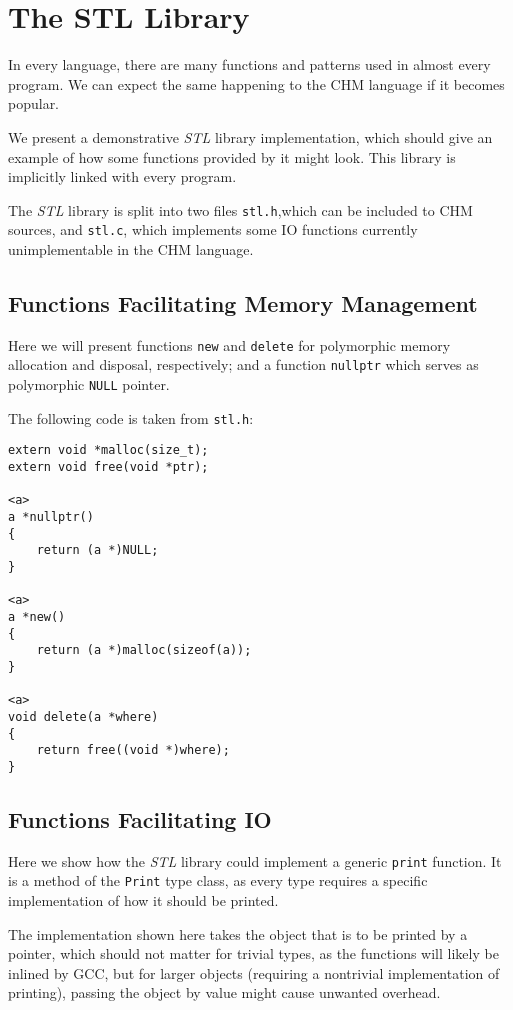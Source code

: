 \chapter{The STL Library}
\label{stl}

In every language, there are many functions and patterns used in almost every program. We can expect the same happening to the CHM language if it becomes popular.

We present a demonstrative \emph{STL} library implementation, which should give an example of how some functions provided by it might look. This library is implicitly linked with every program.

The \emph{STL} library is split into two files \lstinline[language=sh]{stl.h},which can be included to CHM sources, and \lstinline[language=sh]{stl.c}, which implements some IO functions currently unimplementable in the CHM language.

\section{Functions Facilitating Memory Management}

Here we will present functions \lstinline{new} and \lstinline{delete} for polymorphic memory allocation and disposal, respectively; and a function \lstinline{nullptr} which serves as polymorphic \lstinline{NULL} pointer.

The following code is taken from \lstinline[language=sh]{stl.h}:

\begin{lstlisting}
extern void *malloc(size_t);
extern void free(void *ptr);

<a>
a *nullptr()
{
    return (a *)NULL;
}

<a>
a *new()
{
    return (a *)malloc(sizeof(a));
}

<a>
void delete(a *where)
{
    return free((void *)where);
}
\end{lstlisting}

\section{Functions Facilitating IO}

Here we show how the \emph{STL} library could implement a generic \lstinline{print} function. It is a method of the \lstinline{Print} type class, as every type requires a specific implementation of how it should be printed.

The implementation shown here takes the object that is to be printed by a pointer, which should not matter for trivial types, as the functions will likely be inlined by GCC, but for larger objects (requiring a nontrivial implementation of printing), passing the object by value might cause unwanted overhead.

